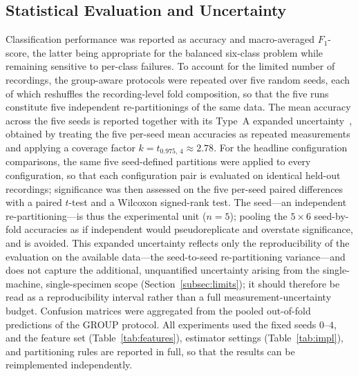 \subsection{Statistical Evaluation and Uncertainty}
Classification performance was reported as accuracy and macro-averaged
$F_1$-score, the latter being appropriate for the balanced six-class problem while
remaining sensitive to per-class failures. To account for the limited number of
recordings, the group-aware protocols were repeated over five random seeds, each
of which reshuffles the recording-level fold composition, so that the five runs
constitute five independent re-partitionings of the same data. The mean accuracy
across the five seeds is reported together with its Type~A expanded
uncertainty~\cite{jcgm2008gum}, obtained by treating the five per-seed mean
accuracies as repeated measurements and applying a coverage factor
$k=t_{0.975,\,4}\approx2.78$. For the headline configuration comparisons, the
same five seed-defined partitions were applied to every configuration, so that
each configuration pair is evaluated on identical held-out recordings;
significance was then assessed on the five per-seed paired differences with a
paired $t$-test and a Wilcoxon signed-rank test. The seed---an independent
re-partitioning---is thus the experimental unit ($n=5$); pooling the $5\times6$
seed-by-fold accuracies as if independent would pseudoreplicate and overstate
significance, and is avoided. This expanded uncertainty reflects only the
reproducibility of the evaluation on the available data---the seed-to-seed
re-partitioning variance---and does not capture the additional, unquantified
uncertainty arising from the single-machine, single-specimen scope
(Section~\ref{subsec:limits}); it should therefore be read as a reproducibility
interval rather than a full measurement-uncertainty budget. Confusion matrices
were aggregated from the pooled out-of-fold predictions of the GROUP protocol.
All experiments used the fixed seeds $0$--$4$, and the feature set
(Table~\ref{tab:features}), estimator settings (Table~\ref{tab:impl}), and
partitioning rules are reported in full, so that the results can be
reimplemented independently.

